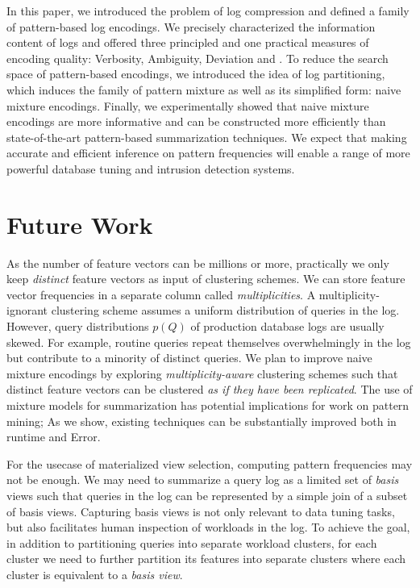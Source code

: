 In this paper, we introduced the problem of log compression and defined a family of pattern-based log encodings. 
We precisely characterized the information content of logs and offered three principled and one practical measures of encoding quality: Verbosity, Ambiguity, Deviation and \errorname. 
To reduce the search space of pattern-based encodings, we introduced the idea of log partitioning, which induces the family of pattern mixture as well as its simplified form: naive mixture encodings. 
Finally, we experimentally showed that naive mixture encodings are more informative and can be constructed more efficiently than state-of-the-art pattern-based summarization techniques. 
We expect that making accurate and efficient inference on pattern frequencies will enable a range of more powerful database tuning and intrusion detection systems.

\section{Future Work}
\label{sec:futurework}

As the number of feature vectors can be millions or more, practically we only keep \textit{distinct} feature vectors as input of clustering schemes.
We can store feature vector frequencies in a separate column called \textit{multiplicities}.
A multiplicity-ignorant clustering scheme assumes a uniform distribution of queries in the log.
However, query distributions $p(Q)$ of production database logs are usually skewed.
For example, routine queries repeat themselves overwhelmingly in the log but contribute to a minority of distinct queries.
We plan to improve naive mixture encodings by exploring \textit{multiplicity-aware} clustering schemes such that distinct feature vectors can be clustered \textit{as if they have been replicated}.
The use of mixture models for summarization has potential implications for work on pattern mining; As we show, existing techniques can be substantially improved both in runtime and Error.

For the usecase of materialized view selection, computing pattern frequencies may not be enough.
We may need to summarize a query log as a limited set of \textit{basis} views such that queries in the log can be represented by a simple join of a subset of basis views.
Capturing basis views is not only relevant to data tuning tasks, but also facilitates human inspection of workloads in the log.
To achieve the goal, in addition to partitioning queries into separate workload clusters, for each cluster we need to further partition its features into separate clusters where each cluster is equivalent to a \textit{basis view}.





